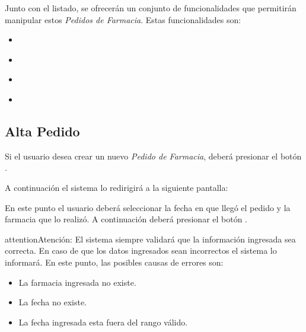 \documentclass[a4paper,10pt,spanish]{sphinxmanual}
\begin{document}
Junto con el listado, se ofrecerán un conjunto de funcionalidades que permitirán manipular estos \emph{Pedidos de Farmacia}.
Estas funcionalidades son:
\begin{itemize}
\item {} 
{\hyperref[pedidosfarmacia:alta\string-pf]{}}

\item {} 
{\hyperref[pedidosfarmacia:ver\string-detalles\string-pf]{}}

\item {} 
{\hyperref[pedidosfarmacia:ver\string-remitos\string-pf]{}}

\item {} 
{\hyperref[pedidosfarmacia:formulario\string-busqueda\string-pf]{}}

\end{itemize}


\subsection{Alta Pedido}
\label{pedidosfarmacia:alta-pf}\label{pedidosfarmacia:alta-pedido}
Si el usuario desea crear un nuevo \emph{Pedido de Farmacia}, deberá presionar el botón .


A continuación el sistema lo redirigirá a la siguiente pantalla:


En este punto el usuario deberá seleccionar la fecha en que llegó el pedido y la farmacia que lo realizó. A continuación deberá presionar el botón .

\begin{notice}{attention}{Atención:}
El sistema siempre validará que la información ingresada sea correcta. En caso de que los datos ingresados sean incorrectos el sistema lo informará.
En este punto, las posibles causas de errores son:
\begin{itemize}
\item {} 
La farmacia ingresada no existe.

\item {} 
La fecha no existe.

\item {} 
La fecha ingresada esta fuera del rango válido.

\end{itemize}
\end{notice}
\end{document}
